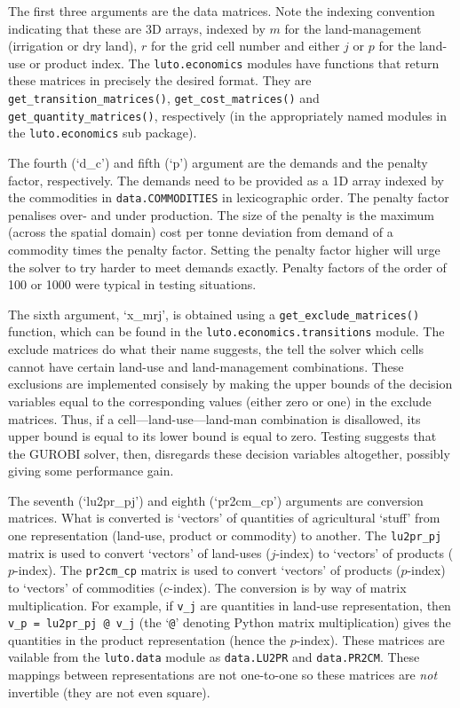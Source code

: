 \documentclass{draft}
\begin{document}
The first three arguments are the data matrices. Note the indexing convention indicating that these are 3D arrays, indexed by $m$ for the land-management (irrigation or dry land), $r$ for the grid cell number and either $j$ or $p$ for the land-use or product index. The \texttt{luto.economics} modules have functions that return these matrices in precisely the desired format. They are \texttt{get_transition_matrices()}, \texttt{get_cost_matrices()} and \texttt{get_quantity_matrices()}, respectively (in the appropriately named modules in the \texttt{luto.economics} sub package).

The fourth (`d_c') and fifth (`p') argument are the demands and the penalty factor, respectively. The demands need to be provided as a 1D array indexed by the commodities in \texttt{data.COMMODITIES} in lexicographic order. The penalty factor penalises over- and under production. The size of the penalty is the maximum (across the spatial domain) cost per tonne deviation from demand of a commodity times the penalty factor. Setting the penalty factor higher will urge the solver to try harder to meet demands exactly. Penalty factors of the order of 100 or 1000 were typical in testing situations.

The sixth argument, `x_mrj', is obtained using a \texttt{get_exclude_matrices()} function, which can be found in the \texttt{luto.economics.transitions} module. The exclude matrices do what their name suggests, the tell the solver which cells cannot have certain land-use and land-management combinations. These exclusions are implemented consisely by making the upper bounds of the decision variables equal to the corresponding values (either zero or one) in the exclude matrices. Thus, if a cell---land-use---land-man combination is disallowed, its upper bound is equal to its lower bound is equal to zero. Testing suggests that the GUROBI solver, then, disregards these decision variables altogether, possibly giving some performance gain.

The seventh (`lu2pr_pj') and eighth (`pr2cm_cp') arguments are conversion matrices. What is converted is `vectors' of quantities of agricultural `stuff' from one representation (land-use, product or commodity) to another. The \texttt{lu2pr_pj} matrix is used to convert `vectors' of land-uses ($j$-index) to `vectors' of products ($p$-index). The \texttt{pr2cm_cp} matrix is used to convert `vectors' of products ($p$-index) to `vectors' of commodities ($c$-index). The conversion is by way of matrix multiplication. For example, if \texttt{v_j} are quantities in land-use representation, then \texttt{v_p = lu2pr_pj @ v_j} (the `\texttt{@}' denoting Python matrix multiplication) gives the quantities in the product representation (hence the $p$-index). These matrices are vailable from the \texttt{luto.data} module as \texttt{data.LU2PR} and \texttt{data.PR2CM}. These mappings between representations are not one-to-one so these matrices are \emph{not} invertible (they are not even square).
\end{document}
